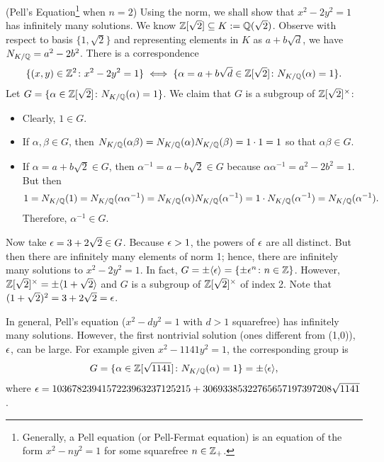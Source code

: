 \begin{ex}(Pell's Equation\footnote{Generally, a Pell equation (or Pell-Fermat equation) is an equation of the form $x^2 - ny^2 = 1$ for some squarefree $n \in \mathbb{Z}_+$.} when $n=2$) \label{ex:pell2}
Using the norm, we shall show that $x^2-2y^2=1$ has infinitely many solutions. We know $\mathbb{Z}[\sqrt{2}] \subseteq K:=\mathbb{Q}(\sqrt{2})$. Observe with respect to basis $\{1, \sqrt{2} \}$ and representing elements in $K$ as $a + b \sqrt{d}$, we have $N_{K/\mathbb{Q}}= a^2 - 2b^2$. There is a correspondence
	\[
	\{ (x,y) \in \mathbb{Z}^2 \colon x^2 - 2y^2=1 \} \iff \{ \alpha= a + b\sqrt{d} \in \mathbb{Z}[\sqrt{2}] \colon N_{K/\mathbb{Q}}(\alpha)= 1 \}.
	\] 
Let $G= \{ \alpha \in \mathbb{Z}[\sqrt{2}] \colon N_{K/\mathbb{Q}}(\alpha)= 1 \}$. We claim that $G$ is a subgroup of $\mathbb{Z}[\sqrt{2}]^\times$:
	\begin{itemize}
	\item Clearly, $1 \in G$.
	\item If $\alpha, \beta \in G$, then $N_{K/\mathbb{Q}}(\alpha\beta)=N_{K/\mathbb{Q}}(\alpha)N_{K/\mathbb{Q}}(\beta)=1\cdot 1=1$ so that $\alpha\beta \in G$.
	\item If $\alpha=a+b\sqrt{2} \in G$, then $\alpha^{-1}=a-b\sqrt{2} \in G$ because $\alpha\alpha^{-1}=a^2-2b^2=1$. But then 
		\[
		1= N_{K/\mathbb{Q}}(1)= N_{K/\mathbb{Q}}(\alpha \alpha^{-1})= N_{K/\mathbb{Q}}(\alpha) N_{K/\mathbb{Q}}(\alpha^{-1})= 1 \cdot N_{K/\mathbb{Q}}(\alpha^{-1})= N_{K/\mathbb{Q}}(\alpha^{-1}).
		\]
	Therefore, $\alpha^{-1} \in G$. 
	\end{itemize}
Now take $\epsilon=3+2\sqrt{2} \in G$. Because $\epsilon>1$, the powers of $\epsilon$ are all distinct. But then there are infinitely many elements of norm 1; hence, there are infinitely many solutions to $x^2-2y^2=1$. In fact, $G=\pm \langle \epsilon \rangle=\{ \pm \epsilon^n \colon n \in \mathbb{Z}\}$. However, $\mathbb{Z}[\sqrt{2}]^\times= \pm \langle 1+\sqrt{2}\rangle$ and $G$ is a subgroup of $\mathbb{Z}[\sqrt{2}]^\times$ of index 2. Note that $(1+\sqrt{2})^2=3+2\sqrt{2}=\epsilon$. \xqed
\end{ex}


\begin{ex} \label{ex:pellgen}
In general, Pell's equation ($x^2-dy^2=1$ with $d>1$ squarefree) has infinitely many solutions. However, the first nontrivial solution (ones different from (1,0)), $\epsilon$, can be large. For example given $x^2-1141y^2=1$, the corresponding group is 
	\[
	G=\{ \alpha \in \mathbb{Z}[\sqrt{1141}] \colon N_{K/\mathbb{Q}}(\alpha)=1\}= \pm \langle \epsilon \rangle,
	\]
where $\epsilon=1036782394157223963237125215+30693385322765657197397208\sqrt{1141}$. \xqed
\end{ex}


